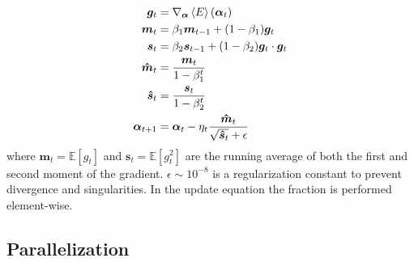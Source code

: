 \begin{align*}%
    \bm{g}_t &= \nabla_{\bm{\alpha}}\expval{E}(\bm{\alpha}_t) \\
    \bm{m}_t &= \beta_1 \bm{m}_{t-1} + (1-\beta_1)\bm{g}_t \\
    \bm{s}_t &= \beta_2 \bm{s}_{t-1} + (1-\beta_2)\bm{g}_t\cdot\bm{g}_t \\
    \bm{\hat{m}}_t &= \frac{\bm{m}_t}{1-\beta_1^t} \\
    \bm{\hat{s}}_t &= \frac{\bm{s}_t}{1-\beta_2^t} \\
    \bm{\alpha}_{t+1} &= \bm{\alpha}_t - \eta_t\frac{\bm{\hat{m}}_t}{\sqrt{\bm{\hat{s}}_t} + \epsilon}
\end{align*}
where $\bm{m}_t = \mathbb{E}[g_t]$ and $\bm{s}_t = \mathbb{E}[g_t^2]$ are the running average of both the first and second moment of the gradient. $\epsilon \sim 10^{-8}$ is a regularization constant to prevent divergence and singularities. In the update equation the fraction is performed element-wise. 






\iffalse
In 2015, D. Kingma and  J. Lei Ba proposed ADAM (short for ADAptive Moment estimation).

Let $f(\theta)$ be a noisy objective function: a stochastic scalar function that is differentiable w.r.t. parameters $\theta$. We are interested in minimizing the expected value of this function, $ \mathbb{E}[f(\theta)]$ w.r.t. its parameters $\theta$. We let $ g_t = \nabla_{\theta} E_{B_k}(\theta_t)$ where $ E_{B_k}(\theta_t) =f_t(\theta_{t-1})$. The sequence $f_1, \cdots , f_T$ denotes the realisations of the stochastic function at subsequent timesteps. The algorithm is given by,
-
As we see, the moment

\fi


\subsection{Parallelization}

